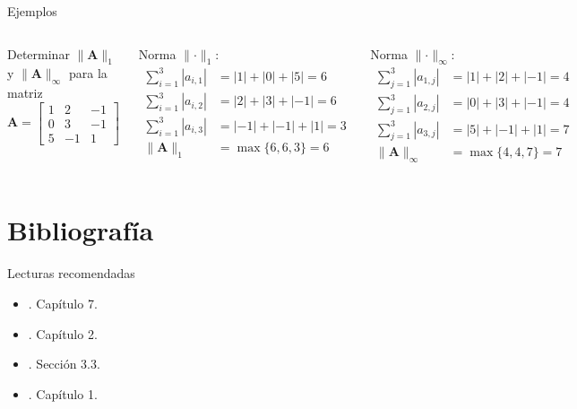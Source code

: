 \documentclass[9pt, aspectratio=169]{beamer}
\begin{document}
\begin{frame}{Ejemplos}
\begin{columns}[t]
\cx
Determinar $\lVert \bm{A} \rVert_{1}$ y $\lVert \bm{A} \rVert_{\infty}$ para la matriz
\[ \bm{A} = \begin{bmatrix}
    1 & 2 & -1 \\
    0 & 3 & -1 \\
    5 & -1 & 1
\end{bmatrix} \]

Norma $\lVert \cdot \rVert_1$:
\begin{align*}
    \sum_{i=1}^3 |a_{i,1}| &= |1| + |0| + |5| = 6 \\
    \sum_{i=1}^3 |a_{i,2}| &= |2| + |3| + |-1| = 6 \\
    \sum_{i=1}^3 |a_{i,3}| &= |-1| + |-1| + |1| = 3 \\
    \lVert \bm{A} \rVert_1 &= \max \{6, 6, 3\} = 6
\end{align*}

\cx
Norma $\lVert \cdot \rVert_{\infty}$: 
\begin{align*}
    \sum_{j=1}^3 |a_{1,j}| &= |1| + |2| + |-1| = 4 \\
    \sum_{j=1}^3 |a_{2,j}| &= |0| + |3| + |-1| = 4 \\
    \sum_{j=1}^3 |a_{3,j}| &= |5| + |-1| + |1| = 7 \\
    \lVert \bm{A} \rVert_{\infty} &= \max \{4, 4, 7\} = 7
\end{align*}

\end{columns}
\end{frame}

\section*{Bibliografía}
\begin{frame}[allowframebreaks]{Lecturas recomendadas}
\begin{itemize}
    \item {}. Capítulo 7.
    \item {}. Capítulo 2.
    \item {}. Sección 3.3.
    \item {}. Capítulo 1.
\end{itemize}
\end{frame}
\end{document}
